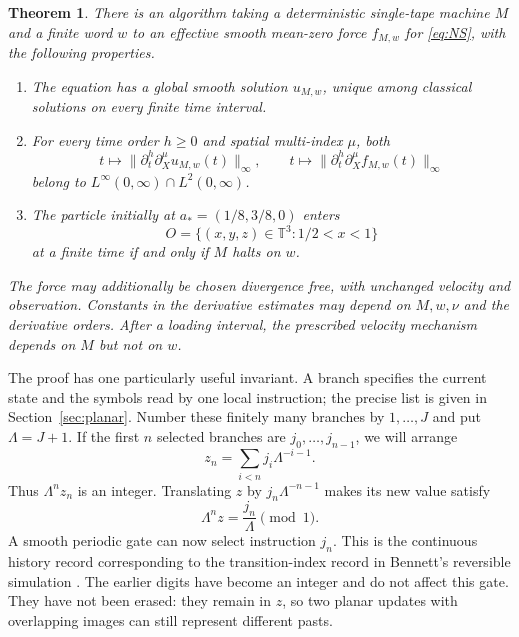 \documentclass[11pt]{article}
\newtheorem{theorem}{Theorem}
\newcommand{\T}{\mathbb T}
\begin{document}
\begin{theorem}\label{thm:main}
There is an algorithm taking a deterministic single-tape machine $M$ and
a finite word $w$ to an effective smooth mean-zero force $f_{M,w}$ for
\eqref{eq:NS}, with the following properties.
\begin{enumerate}
\item The equation has a global smooth solution $u_{M,w}$, unique among
classical solutions on every finite time interval.
\item For every time order $h\geq0$ and spatial multi-index $\mu$, both
\[
 t\longmapsto\|\partial_t^h\partial_X^\mu u_{M,w}(t)\|_\infty,
 \qquad
 t\longmapsto\|\partial_t^h\partial_X^\mu f_{M,w}(t)\|_\infty
\]
belong to $L^\infty(0,\infty)\cap L^2(0,\infty)$.
\item The particle initially at $a_*=(1/8,3/8,0)$ enters
\[
 O=\{(x,y,z)\in\T^3:1/2<x<1\}
\]
at a finite time if and only if $M$ halts on $w$.
\end{enumerate}
The force may additionally be chosen divergence free, with unchanged
velocity and observation. Constants in the derivative estimates may
depend on $M,w,\nu$ and the derivative orders. After a loading interval,
the prescribed velocity mechanism depends on $M$ but not on $w$.
\end{theorem}

The proof has one particularly useful invariant. A branch specifies the
current state and the symbols read by one local instruction; the precise
list is given in Section~\ref{sec:planar}. Number these finitely many branches by $1,\ldots,J$ and put $\Lambda=J+1$.
If the first $n$ selected branches are $j_0,\ldots,j_{n-1}$, we will arrange
\begin{equation}\label{eq:history}
 z_n=\sum_{i<n}j_i\Lambda^{-i-1}.
\end{equation}
Thus $\Lambda^n z_n$ is an integer. Translating $z$ by
$j_n\Lambda^{-n-1}$ makes its new value satisfy
\begin{equation}\label{eq:selector}
 \Lambda^n z=\frac{j_n}{\Lambda}\pmod 1.
\end{equation}
A smooth periodic gate can now select instruction $j_n$. This is the
continuous history record corresponding to the transition-index record
in Bennett's reversible simulation \cite{Bennett}. The earlier
digits have become an integer and do not affect this gate. They have not
been erased: they remain in $z$, so two planar updates with overlapping
images can still represent different pasts.
\end{document}
